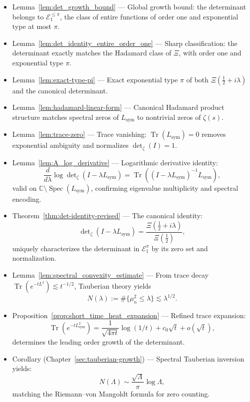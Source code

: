 \begin{itemize}
  \item Lemma~\ref{lem:det_growth_bound} — Global growth bound: the determinant belongs to \( \mathcal{E}_1^{\leq \pi} \), the class of entire functions of order one and exponential type at most \( \pi \).

  \item Lemma~\ref{lem:det_identity_entire_order_one} — Sharp classification: the determinant exactly matches the Hadamard class of \( \Xi \), with order one and exponential type \( \pi \).

  \item Lemma~\ref{lem:exact-type-pi} — Exact exponential type \( \pi \) of both \( \Xi(\tfrac{1}{2} + i\lambda) \) and the canonical determinant.

  \item Lemma~\ref{lem:hadamard-linear-form} — Canonical Hadamard product structure matches spectral zeros of \( L_{\mathrm{sym}} \) to nontrivial zeros of \( \zeta(s) \).

  \item Lemma~\ref{lem:trace-zero} — Trace vanishing: \( \operatorname{Tr}(L_{\mathrm{sym}}) = 0 \) removes exponential ambiguity and normalizes \( \det\nolimits_\zeta(I) = 1 \).

  \item Lemma~\ref{lem:A_log_derivative} — Logarithmic derivative identity:
  \[
  \frac{d}{d\lambda} \log \det\nolimits_\zeta(I - \lambda L_{\mathrm{sym}})
  = \operatorname{Tr}\left( (I - \lambda L_{\mathrm{sym}})^{-1} L_{\mathrm{sym}} \right),
  \]
  valid on \( \mathbb{C} \setminus \operatorname{Spec}(L_{\mathrm{sym}}) \), confirming eigenvalue multiplicity and spectral encoding.

  \item Theorem~\ref{thm:det-identity-revised} — The canonical identity:
  \[
  \det\nolimits_\zeta(I - \lambda L_{\mathrm{sym}})
  = \frac{\Xi(\tfrac{1}{2} + i\lambda)}{\Xi(\tfrac{1}{2})},
  \]
  uniquely characterizes the determinant in \( \mathcal{E}_1^\pi \) by its zero set and normalization.

  \item Lemma~\ref{lem:spectral_convexity_estimate} — From trace decay \( \operatorname{Tr}(e^{-tL^2}) \lesssim t^{-1/2} \), Tauberian theory yields
  \[
  N(\lambda) := \#\{ \mu_n^2 \le \lambda \} \lesssim \lambda^{1/2}.
  \]

  \item Proposition~\ref{prop:short_time_heat_expansion} — Refined trace expansion:
  \[
  \operatorname{Tr}(e^{-tL^2_{\mathrm{sym}}}) = \frac{1}{\sqrt{4\pi t}} \log(1/t) + c_0 \sqrt{t} + o(\sqrt{t}),
  \]
  determines the leading order growth of the determinant.

  \item Corollary (Chapter~\ref{sec:tauberian-growth}) — Spectral Tauberian inversion yields:
  \[
  N(\Lambda) \sim \frac{\sqrt{\Lambda}}{\pi} \log \Lambda,
  \]
  matching the Riemann–von Mangoldt formula for zero counting.
\end{itemize}

